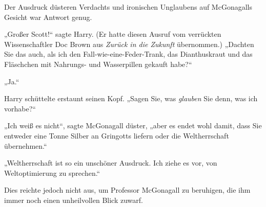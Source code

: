 Der Ausdruck düsteren Verdachts und ironischen Unglaubens auf McGonagalls Gesicht war Antwort genug.

„Großer Scott!“ sagte Harry. (Er hatte diesen Ausruf vom verrückten Wissenschaftler Doc Brown aus \emph{Zurück in die Zukunft} übernommen.) „Dachten Sie das auch, als ich den Fall-wie-eine-Feder-Trank, das Dianthuskraut und das Fläschchen mit Nahrungs- und Wasserpillen gekauft habe?“%

„Ja.“

Harry schüttelte erstaunt seinen Kopf. „Sagen Sie, was \emph{glauben} Sie denn, was ich vorhabe?“

„Ich weiß es nicht“, sagte McGonagall düster, „aber es endet wohl damit, dass Sie entweder eine Tonne Silber an Gringotts liefern oder die Weltherrschaft übernehmen.“

„Weltherrschaft ist so ein unschöner Ausdruck. Ich ziehe es vor, von Weltoptimierung zu sprechen.“

Dies reichte jedoch nicht aus, um Professor McGonagall zu beruhigen, die ihm immer noch einen unheilvollen Blick zuwarf.

